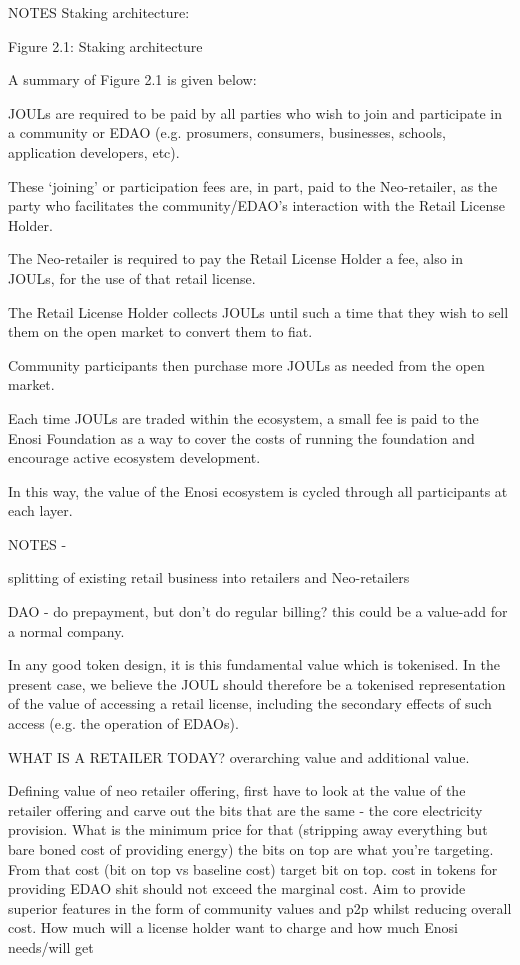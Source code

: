 \documentclass{article}
\theoremstyle{definition}
\theoremstyle{plain} %
\begin{document}
NOTES
Staking architecture:

Figure 2.1: Staking architecture	

A summary of Figure 2.1 is given below:

JOULs are required to be paid by all parties who wish to join and participate in a community or EDAO (e.g. prosumers, consumers, businesses, schools, application developers, etc).

These ‘joining’ or participation fees are, in part, paid to the Neo-retailer, as the party who facilitates the community/EDAO’s interaction with the Retail License Holder. 


The Neo-retailer is required to pay the Retail License Holder a fee, also in JOULs, for the use of that retail license. 

The Retail License Holder collects JOULs until such a time that they wish to sell them on the open market to convert them to fiat. 


Community participants then purchase more JOULs as needed from the open market.


Each time JOULs are traded within the ecosystem, a small fee is paid to the Enosi Foundation as a way to cover the costs of running the foundation and encourage active ecosystem development.

In this way, the value of the Enosi ecosystem is cycled through all participants at each layer. 





NOTES - 

splitting of existing retail business into retailers and Neo-retailers

DAO - do prepayment, but don’t do regular billing? this could be a value-add for a normal company.


In any good token design, it is this fundamental value which is tokenised. In the present case, we believe the JOUL should therefore be a tokenised representation of the value of accessing a retail license, including the secondary effects of such access (e.g. the operation of EDAOs).

WHAT IS A RETAILER TODAY? overarching value and additional value.

Defining value of neo retailer offering, first have to look at the value of the retailer offering and carve out the bits that are the same - the core electricity provision. What is the minimum price for that (stripping away everything but bare boned cost of providing energy) the bits on top are what you're targeting. From that cost (bit on top vs baseline cost) target bit on top. cost in tokens for providing EDAO shit should not exceed the marginal cost. Aim to provide superior features in the form of community values and p2p whilst reducing overall cost. How much will a license holder want to charge and how much Enosi needs/will get
\end{document}
